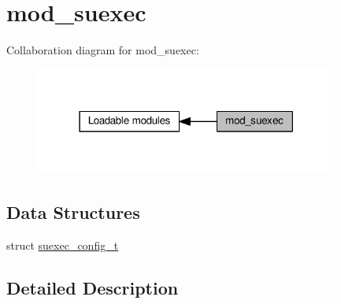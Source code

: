 \hypertarget{group__MOD__SUEXEC}{}\section{mod\+\_\+suexec}
\label{group__MOD__SUEXEC}
Collaboration diagram for mod\+\_\+suexec\+:
\nopagebreak
\begin{figure}[H]
\begin{center}
\leavevmode
\includegraphics[width=283pt]{group__MOD__SUEXEC}
\end{center}
\end{figure}
\subsection*{Data Structures}
\begin{DoxyCompactItemize}
\item 
struct \hyperlink{structsuexec__config__t}{suexec\+\_\+config\+\_\+t}
\end{DoxyCompactItemize}


\subsection{Detailed Description}
